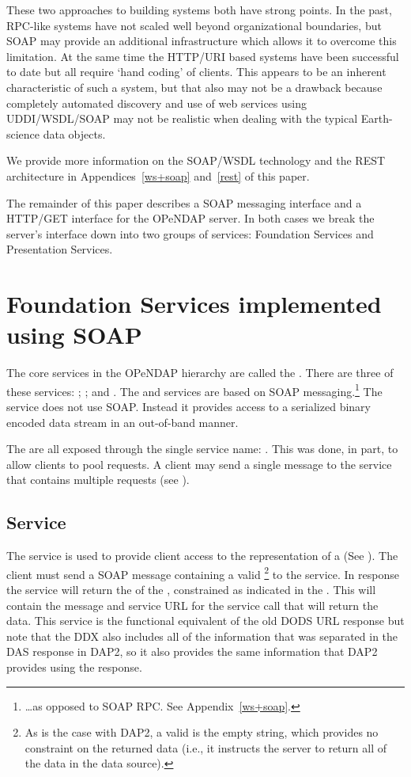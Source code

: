 \documentclass[justify]{dods-paper}
\begin{document}
These two approaches to building systems both have strong points. In
the past, RPC-like systems have not scaled well beyond organizational
boundaries, but SOAP may provide an additional infrastructure which
allows it to overcome this limitation. At the same time the HTTP/URI
based systems have been successful to date but all require `hand
coding' of clients. This appears to be an inherent characteristic of
such a system, but that also may not be a drawback because completely
automated discovery and use of web services using UDDI/WSDL/SOAP may
not be realistic when dealing with the typical Earth-science data
objects.

We provide more information on the SOAP/WSDL technology and the REST
architecture in Appendices~\ref{ws+soap} and~\ref{rest} of this paper.

The remainder of this paper describes a SOAP messaging interface and a
HTTP/GET interface for the OPeNDAP server. In both cases we break
the server's interface down into two groups of services: Foundation
Services and Presentation Services.

\section {Foundation Services implemented using SOAP}
\label{FndSrvcs}

The core services in the OPeNDAP hierarchy are called the \FSs. There
are three of these services: \GetDDX; \GetData; and \GetBlob. The
\GetDDX and \GetData services are based on SOAP
messaging.\footnote{\ldots as opposed to SOAP RPC.
  See Appendix~\ref{ws+soap}.} The \GetBlob service does not use SOAP.
Instead it provides access to a serialized binary encoded data stream
in an out-of-band manner.

The \FSs are all exposed through the single service name: \ODSN.
This was done, in part, to allow clients to pool requests. A client may
send a single message to the \ODSN service that contains multiple
requests (see ).

\subsection {\GetDDX Service}
\label {getDDX}

The \GetDDX service is used to provide client access to the \DDX
representation of a \Dataset (See \DAPObjectsTitle). The client must
send a SOAP message containing a valid \CE\footnote{As is the case
  with DAP2, a valid \CE is the empty string, which provides no
  constraint on the returned data (i.e., it instructs the server to
  return all of the data in the data source).} to the service. In
response the service will return the \DDX of the \Dataset, constrained
as indicated in the \CE. This \DDX will contain the message and
service URL for the \GetBlob service call that will return the \Blob
data. This service is the functional equivalent of the old DODS URL
 response but note that the DDX also includes all of the
information that was separated in the DAS response in DAP2, so it also
provides the same information that DAP2 provides using the 
response. 
\end{document}
